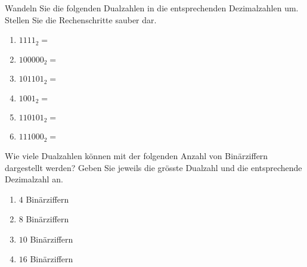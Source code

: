 \begin{exercise}
Wandeln Sie die folgenden Dualzahlen in die entsprechenden Dezimalzahlen um. Stellen Sie die Rechenschritte sauber dar.

\begin{multicols}{2}
\begin{enumerate}

\item $1111_2= $ \\
\begin{minipage}{\linewidth}
\centering
\fillwithgrid{1in}
\end{minipage}

\item $100000_2= $ \\
\begin{minipage}{\linewidth}
\centering
\fillwithgrid{1in}
\end{minipage}

\item $101101_2= $ \\
\begin{minipage}{\linewidth}
\centering
\fillwithgrid{1in}
\end{minipage}

\item $1001_2= $ \\
\begin{minipage}{\linewidth}
\centering
\fillwithgrid{1in}
\end{minipage}

\item $110101_2= $ \\
\begin{minipage}{\linewidth}
\centering
\fillwithgrid{1in}
\end{minipage}

\item $111000_2= $ \\
\begin{minipage}{\linewidth}
\centering
\fillwithgrid{1in}
\end{minipage}

\end{enumerate}
\end{multicols}
\end{exercise}

\begin{exercise}
Wie viele Dualzahlen können mit der folgenden Anzahl von Binärziffern dargestellt werden? Geben Sie jeweils die grösste Dualzahl und die entsprechende Dezimalzahl an.

\begin{enumerate}
\item $4$ Binärziffern
\fillwithgrid{0.25in}
\item $8$ Binärziffern
\fillwithgrid{0.25in}
\item $10$ Binärziffern
\fillwithgrid{0.25in}
\item $16$ Binärziffern
\fillwithgrid{0.25in}
\end{enumerate}
\end{exercise}

